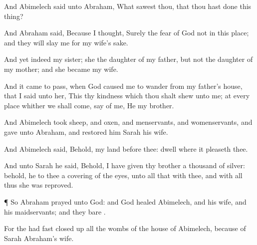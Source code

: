 {And
Abimelech
said unto
Abraham,
What sawest
thou, that thou hast
done this
thing?

And
Abraham
said, Because I
thought,
Surely the
fear of
God
{} not in this
place; and they will slay
me for my
wife’s
sake.

And yet
indeed
{} my
sister; she
{} the
daughter of my
father, but not the
daughter of my
mother; and she became my
wife.

And it came to pass, when
God caused me to
wander from my
father’s
house, that I
said unto her, This
{} thy
kindness which thou shalt
shew unto me; at every
place whither we shall
come,
say of me, He
{} my
brother.


\par }{\PP {}And
Abimelech
took
sheep, and
oxen, and
menservants, and
womenservants, and
gave
{} unto
Abraham, and
restored him
Sarah his
wife.

And
Abimelech
said, Behold, my
land
{} before
thee:
dwell where it
pleaseth thee.

And unto
Sarah he
said, Behold, I have
given thy
brother a
thousand
{} of
silver: behold, he
{} to thee a
covering of the
eyes, unto all that
{} with thee, and with all
{} thus she was
reproved.


\par }{\PP {}¶ So
Abraham
prayed unto
God: and
God
healed
Abimelech, and his
wife, and his
maidservants; and they
bare
{}.

For the
{} had
fast closed
up all the
wombs of the
house of
Abimelech,
because of
Sarah
Abraham’s
wife.




\par }

